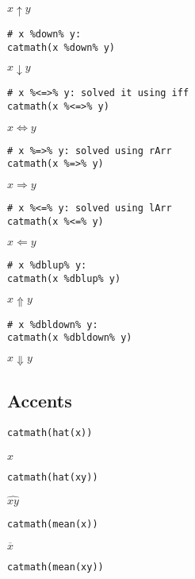 \({{x}\uparrow{y}}\)

\begin{verbatim}
# x %down% y:
catmath(x %down% y)
\end{verbatim}

\({{x}\downarrow{y}}\)

\begin{verbatim}
# x %<=>% y: solved it using iff
catmath(x %<=>% y)
\end{verbatim}

\({{x}\iff{y}}\)

\begin{verbatim}
# x %=>% y: solved using rArr
catmath(x %=>% y)
\end{verbatim}

\({{x}\Rightarrow{y}}\)

\begin{verbatim}
# x %<=% y: solved using lArr
catmath(x %<=% y)
\end{verbatim}

\({{x}\Leftarrow{y}}\)

\begin{verbatim}
# x %dblup% y:
catmath(x %dblup% y)
\end{verbatim}

\({{x}\Uparrow{y}}\)

\begin{verbatim}
# x %dbldown% y:
catmath(x %dbldown% y)
\end{verbatim}

\({{x}\Downarrow{y}}\)

\hypertarget{accents}{%
\subsection{Accents}\label{accents}}

\begin{verbatim}
catmath(hat(x))
\end{verbatim}

\(\hat{{x}}\)

\begin{verbatim}
catmath(hat(xy))
\end{verbatim}

\(\hat{{xy}}\)

\begin{verbatim}
catmath(mean(x))
\end{verbatim}

\(\overline{{x}}\)

\begin{verbatim}
catmath(mean(xy))
\end{verbatim}

